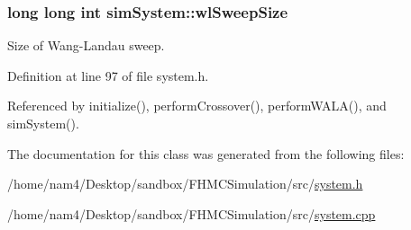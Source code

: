 \hypertarget{classsim_system_ae625e1026daee4f99f83fb73881875a1}{
\subsubsection[{wl\-Sweep\-Size}]{\setlength{\rightskip}{0pt plus 5cm}long long int sim\-System\-::wl\-Sweep\-Size}}\label{classsim_system_ae625e1026daee4f99f83fb73881875a1}


Size of Wang-\/\-Landau sweep. 



Definition at line 97 of file system.\-h.



Referenced by initialize(), perform\-Crossover(), perform\-W\-A\-L\-A(), and sim\-System().



The documentation for this class was generated from the following files\-:\begin{DoxyCompactItemize}
\item 
/home/nam4/\-Desktop/sandbox/\-F\-H\-M\-C\-Simulation/src/\hyperlink{system_8h}{system.\-h}\item 
/home/nam4/\-Desktop/sandbox/\-F\-H\-M\-C\-Simulation/src/\hyperlink{system_8cpp}{system.\-cpp}\end{DoxyCompactItemize}
